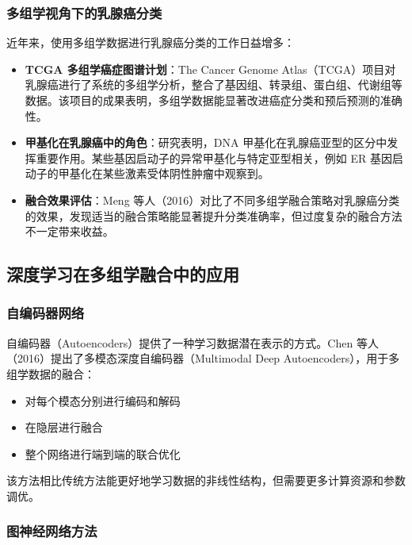 \subsubsection{多组学视角下的乳腺癌分类}

近年来，使用多组学数据进行乳腺癌分类的工作日益增多：

\begin{itemize}
    \item \textbf{TCGA 多组学癌症图谱计划}：The Cancer Genome Atlas（TCGA）项目对乳腺癌进行了系统的多组学分析，整合了基因组、转录组、蛋白组、代谢组等数据。该项目的成果表明，多组学数据能显著改进癌症分类和预后预测的准确性。
    
    \item \textbf{甲基化在乳腺癌中的角色}：研究表明，DNA 甲基化在乳腺癌亚型的区分中发挥重要作用。某些基因启动子的异常甲基化与特定亚型相关，例如 ER 基因启动子的甲基化在某些激素受体阴性肿瘤中观察到。
    
    \item \textbf{融合效果评估}：Meng 等人（2016）对比了不同多组学融合策略对乳腺癌分类的效果，发现适当的融合策略能显著提升分类准确率，但过度复杂的融合方法不一定带来收益。
\end{itemize}

\subsection{深度学习在多组学融合中的应用}

\subsubsection{自编码器网络}

自编码器（Autoencoders）提供了一种学习数据潜在表示的方式。Chen 等人（2016）提出了多模态深度自编码器（Multimodal Deep Autoencoders），用于多组学数据的融合：

\begin{itemize}
    \item 对每个模态分别进行编码和解码
    \item 在隐层进行融合
    \item 整个网络进行端到端的联合优化
\end{itemize}

该方法相比传统方法能更好地学习数据的非线性结构，但需要更多计算资源和参数调优。

\subsubsection{图神经网络方法}

